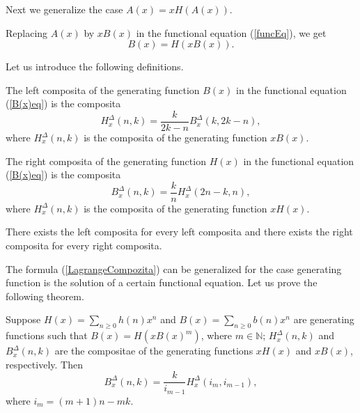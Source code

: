 \documentclass[12pt]{article}
\begin{document}
Next we generalize the case $A(x)=xH(A(x))$. 

Replacing $A(x)$ by $xB(x)$ in the functional equation (\ref{funcEq}), we get
\begin{equation}
B(x)=H(xB(x)).
\label{B(x)eq}
\end{equation}


Let us introduce the following definitions.
\begin{definition} The left composita of the generating function $B(x)$ in the functional equation (\ref{B(x)eq}) is the composita
$$
H_x^{\Delta}(n,k)=\frac{k}{2k-n}B_x^{\Delta}(k,2k-n),
$$
where $H_x^{\Delta}(n,k)$ is the composita of the generating function $xB(x)$.
\end{definition}

\begin{definition} The right composita of the generating function $H(x)$ in the functional equation (\ref{B(x)eq}) is the composita
$$
B_x^{\Delta}(n,k)=\frac{k}{n}H_x^{\Delta}(2n-k,n),
$$
where $H_x^{\Delta}(n,k)$ is the composita of the generating function $xH(x)$.
\end{definition}
There exists the left composita for every left composita and there exists the right composita for every right composita.

The formula (\ref{LagrangeCompozita}) can be generalized for the case generating function is the solution of a certain functional equation. 
Let us prove the following theorem.

\begin{theorem}
\label{Generalization}
Suppose  $H(x)=\sum_{n\geq 0}h(n)x^n$ and $B(x)=\sum_{n\geq 0}b(n)x^n$ are generating functions such that  
$B(x)=H(xB(x)^m)$, where $m\in \mathbb{N}$; $H_x^{\Delta}(n,k)$ and $B_x^{\Delta}(n,k)$ are the compositae of the generating functions $xH(x)$ and $xB(x)$, respectively. Then
\begin{equation}
B_x^{\Delta}(n,k)=\frac{k}{i_{m-1}}H_x^{\Delta}(i_m,i_{m-1}),
\end{equation}
where $i_m=(m+1)n-mk.
$
\end{theorem} 
\end{document}
